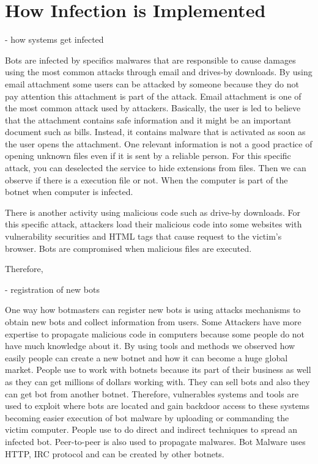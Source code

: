 \documentclass{acm_proc_article-sp}
\begin{document}
\section{How Infection is Implemented}
    - how systems get infected

Bots are infected by specifics malwares that are responsible to cause damages using the most common attacks through email and drives-by downloads. By using email attachment some users can be attacked by someone because they do not pay attention this attachment is part of the attack. Email attachment is one of the most common attack used by attackers. Basically, the user is led to believe that the attachment contains safe information and it might be an important document such as bills. Instead, it contains malware that is activated as soon as the user opens the attachment. One relevant information is not a good practice of opening unknown files even if it is sent by a reliable person. For this specific attack, you can deselected the service to hide extensions from files. Then we can observe if there is a execution file or not. When the computer is part of the botnet when computer is infected.

There is another activity using malicious code such as drive-by downloads. For this specific attack, attackers load their malicious code into some websites with vulnerability securities and HTML tags that cause request to the victim’s browser. Bots are compromised when malicious files are executed. 

Therefore, 

    - registration of new bots

One way how botmasters can register new bots is using attacks mechanisms to obtain new bots and collect information from users. Some Attackers have more expertise to propagate malicious code in computers because some people do not have much knowledge about it. By using tools and methods we observed how easily people can create a new botnet and how it can become a huge global market. People use to work with botnets because its part of their business as well as they can get millions of dollars working with. They can sell bots and also they can get bot from another botnet. Therefore, vulnerables systems and tools are used to exploit where bots are located and gain backdoor access to these systems becoming easier execution of bot malware by uploading or commanding the victim computer. People use to do direct and indirect techniques to spread an infected bot.  Peer-to-peer is also used to propagate malwares. Bot Malware uses HTTP, IRC protocol and can be created by other botnets. 
\end{document}
